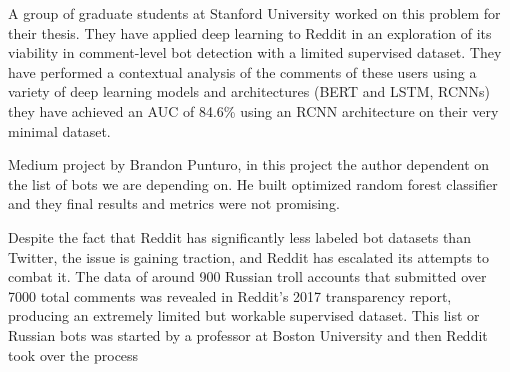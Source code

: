 \documentclass{article}
\begin{document}
     A group of graduate students at Stanford University worked on this problem for their thesis. They have applied deep learning to Reddit in an exploration of its viability in comment-level bot detection with a limited supervised dataset. They have performed a contextual analysis of the comments of these users using a variety of deep learning models and architectures (BERT and LSTM, RCNNs) they have achieved an AUC of 84.6\% using an RCNN architecture on their very minimal dataset.\par
     
     Medium project by Brandon Punturo, in this project the author dependent on the list of bots we are depending on. He built optimized random forest classifier and they final results and metrics were not promising.\par
     
     
     Despite the fact that Reddit has significantly less labeled bot datasets than Twitter, the issue is gaining traction, and Reddit has escalated its attempts to combat it. The data of around 900 Russian troll accounts that submitted over 7000 total comments was revealed in Reddit's 2017 transparency report, producing an extremely limited but workable supervised dataset. This list or Russian bots was started by a professor at Boston University and then Reddit took over the process \par
     
     
     

    
\end{document}
